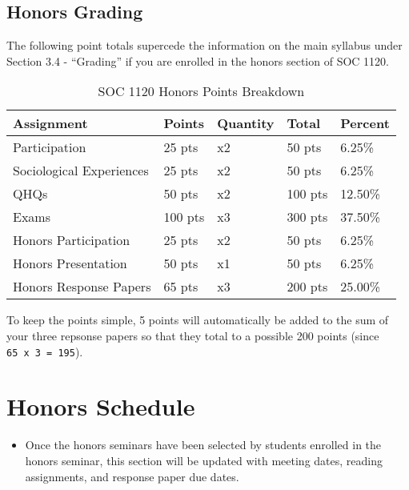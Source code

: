 \documentclass[]{book}
\newenvironment{rmdblock}[1]
  {\begin{shaded*}
  \begin{itemize}
  \renewcommand{\labelitemi}{
    \raisebox{-.7\height}[0pt][0pt]{
      {\setkeys{Gin}{width=3em,keepaspectratio}\texttt{[image: images/\#1]}}
    }
  }
  \item
  }
  {
  \end{itemize}
  \end{shaded*}
  }
\newenvironment{rmdwarning}
  {\begin{rmdblock}{warning}}
  {\end{rmdblock}}
\theoremstyle{definition}
\theoremstyle{definition}
\theoremstyle{definition}
\theoremstyle{remark}
\begin{document}
\hypertarget{honors-grading}{%
\section{Honors Grading}\label{honors-grading}}

The following point totals supercede the information on the main
syllabus under Section 3.4 - ``Grading'' if you are enrolled in the
honors section of SOC 1120.

\begin{table}

\caption{\label{tab:unnamed-chunk-5}SOC 1120 Honors Points Breakdown}
\centering
\begin{tabular}[t]{lllll}
\toprule
Assignment & Points & Quantity & Total & Percent\\
\midrule
Participation & 25 pts & x2 & 50 pts & 6.25\%\\
Sociological Experiences & 25 pts & x2 & 50 pts & 6.25\%\\
QHQs & 50 pts & x2 & 100 pts & 12.50\%\\
Exams & 100 pts & x3 & 300 pts & 37.50\%\\
Honors Participation & 25 pts & x2 & 50 pts & 6.25\%\\
\addlinespace
Honors Presentation & 50 pts & x1 & 50 pts & 6.25\%\\
Honors Response Papers & 65 pts & x3 & 200 pts & 25.00\%\\
\bottomrule
\end{tabular}
\end{table}

To keep the points simple, 5 points will automatically be added to the
sum of your three repsonse papers so that they total to a possible 200
points (since \texttt{65\ x\ 3\ =\ 195}).

\hypertarget{honors-schedule}{%
\chapter{Honors Schedule}\label{honors-schedule}}

\begin{rmdwarning}
Once the honors seminars have been selected by students enrolled in the
honors seminar, this section will be updated with meeting dates, reading
assignments, and response paper due dates.
\end{rmdwarning}


\end{document}
